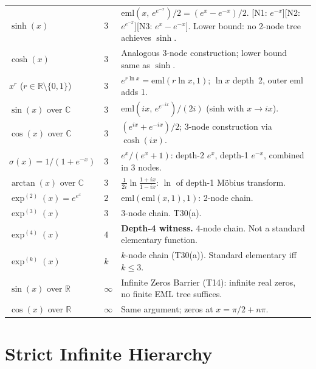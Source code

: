 \documentclass[12pt,a4paper]{article}
\theoremstyle{definition}
\theoremstyle{remark}
\begin{document}
\begin{longtable}{@{}llp{8.5cm}@{}}
$\sinh(x)$
  & $3$
  & $\mathrm{eml}(x,\,e^{e^{-x}})/2 = (e^x-e^{-x})/2$.
    [N1: $e^{-x}$][N2: $e^{e^{-x}}$][N3: $e^x-e^{-x}$].
    Lower bound: no 2-node tree achieves $\sinh$. \\[2pt]
$\cosh(x)$
  & $3$
  & Analogous 3-node construction; lower bound same as $\sinh$. \\[2pt]
$x^r$ ($r \in \mathbb{R} \setminus \{0,1\}$)
  & $3$
  & $e^{r\ln x} = \mathrm{eml}(r\ln x, 1)$; $\ln x$ depth~2, outer $\mathrm{eml}$ adds 1. \\[2pt]
$\sin(x)$ over $\mathbb{C}$
  & $3$
  & $\mathrm{eml}(ix,\,e^{e^{-ix}})/(2i)$ (sinh with $x \to ix$). \\[2pt]
$\cos(x)$ over $\mathbb{C}$
  & $3$
  & $(e^{ix}+e^{-ix})/2$; 3-node construction via $\cosh(ix)$. \\[2pt]
$\sigma(x) = 1/(1+e^{-x})$
  & $3$
  & $e^x/(e^x+1)$: depth-2 $e^x$, depth-1 $e^{-x}$, combined in 3 nodes. \\[2pt]
$\arctan(x)$ over $\mathbb{C}$
  & $3$
  & $\frac{1}{2i}\ln\!\frac{1+ix}{1-ix}$: $\ln$ of depth-1 Möbius transform. \\[5pt]

$\exp^{(2)}(x) = e^{e^x}$
  & $2$
  & $\mathrm{eml}(\mathrm{eml}(x,1),1)$: 2-node chain. \\[2pt]
$\exp^{(3)}(x)$
  & $3$
  & 3-node chain. T30(a). \\[2pt]
$\exp^{(4)}(x)$
  & $4$
  & \textbf{Depth-4 witness.} 4-node chain. Not a standard elementary function. \\[2pt]
$\exp^{(k)}(x)$
  & $k$
  & $k$-node chain (T30(a)). Standard elementary iff $k \leq 3$. \\[5pt]

$\sin(x)$ over $\mathbb{R}$
  & $\infty$
  & Infinite Zeros Barrier (T14): infinite real zeros, no finite EML tree suffices. \\[2pt]
$\cos(x)$ over $\mathbb{R}$
  & $\infty$
  & Same argument; zeros at $x = \pi/2 + n\pi$. \\

\end{longtable}

\section{Strict Infinite Hierarchy}
\label{sec:hierarchy}
\end{document}
